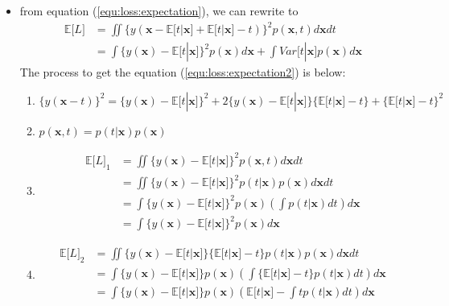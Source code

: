 \documentclass[UTF8]{article}
\begin{document}
\begin{itemize}
\[            \]
        \item from equation (\ref{equ:loss:expectation}), we can rewrite to
        \begin{align}
            \mathbb{E}\lbrack L\rbrack&=\iint\{y(\bm{x}-\mathbb{E}\lbrack t|\bm{x}\rbrack
            +\mathbb{E}\lbrack t|\bm{x}\rbrack-t)\}^2p(\bm{x},t)d\bm{x}dt\nonumber\\
            \label{equ:loss:expectation2}
            &=\int\{y(\bm{x})-\mathbb{E}\lbrack t|\bm{x}\rbrack\}^2p(\bm{x})d\bm{x}+
            \int Var\lbrack t|\bm{x}\rbrack p(\bm{x})d\bm{x}
        \end{align}
        The process to get the equation (\ref{equ:loss:expectation2}) is below:
        \begin{enumerate}
            \item $\{y(\bm{x}-t)\}^2=\{y(\bm{x})-\mathbb{E}\lbrack t|\bm{x}\rbrack\}^2
            +2\{y(\bm{x})-\mathbb{E}\lbrack t|\bm{x}\rbrack\}\{\mathbb{E}\lbrack t|\bm{x}
            \rbrack-t\}+\{\mathbb{E}\lbrack t|\bm{x}\rbrack-t\}^2$
            \item $p(\bm{x},t)=p(t|\bm{x})p(\bm{x})$
            \item \begin{align*}
            \mathbb{E}\lbrack L\rbrack_1&=\iint\{y(\bm{x})-\mathbb{E}\lbrack t|\bm{x}
            \rbrack\}^2p(\bm{x},t)d\bm{x}dt\\
            &=\iint\{y(\bm{x})-\mathbb{E}\lbrack t|\bm{x}\rbrack\}^2p(t|\bm{x})p(\bm{x})d\bm{x}dt\\
            &=\int\{y(\bm{x})-\mathbb{E}\lbrack t|\bm{x}\rbrack\}^2p(\bm{x})
            (\int p(t|\bm{x})dt)d\bm{x}\\
            &=\int\{y(\bm{x})-\mathbb{E}\lbrack t|\bm{x}\rbrack\}^2p(\bm{x})d\bm{x}
            \end{align*}
            \item \begin{align*}
                \mathbb{E}\lbrack L\rbrack_2&=\iint\{y(\bm{x})-\mathbb{E}\lbrack t|\bm{x}\rbrack\}
                \{\mathbb{E}\lbrack t|\bm{x}\rbrack-t\}p(t|\bm{x})p(\bm{x})d\bm{x}dt\\
                &=\int\{y(\bm{x})-\mathbb{E}\lbrack t|\bm{x}\rbrack\}p(\bm{x})
                (\int\{\mathbb{E}\lbrack t|\bm{x}\rbrack-t\}p(t|\bm{x})dt)d\bm{x}\\
                &=\int\{y(\bm{x})-\mathbb{E}\lbrack t|\bm{x}\rbrack\}p(\bm{x})
                (\mathbb{E}\lbrack t|\bm{x}\rbrack-\int tp(t|\bm{x})dt)d\bm{x}\\

\end{align*}
\end{enumerate}
\end{itemize}
\end{document}
